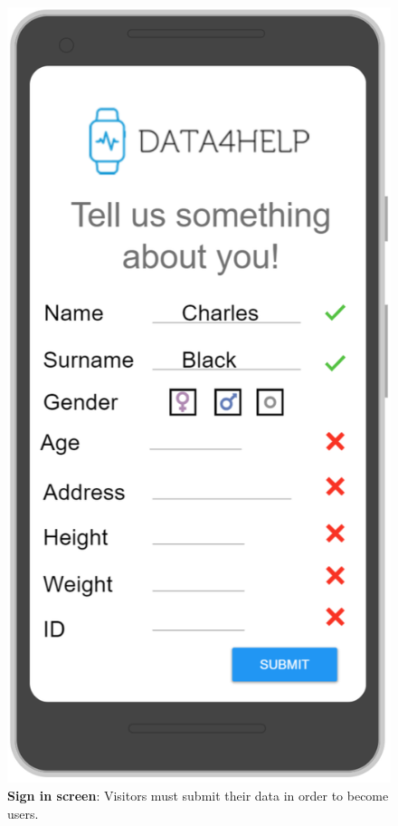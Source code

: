\begin{figure}[H]
\centering
\includegraphics[scale = 0.5]{Mocks/Mobile_Sign_In.PNG}
\caption{\textbf{Sign in screen}: Visitors must submit their data in order to become users.}
\end{figure}

